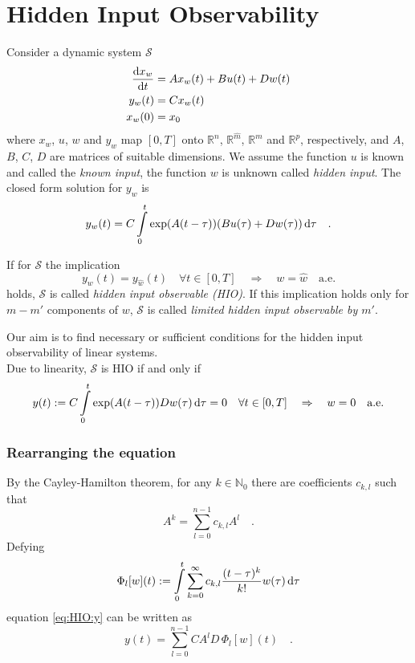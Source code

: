 \section{Hidden Input Observability}
Consider a dynamic system $\mathcal{S}$
\begin{align}
\frac{\text{d} x_w}{\text{d} t} &= Ax_w(t) + Bu(t) + Dw(t) \\
y_w(t) &= Cx_w(t) \\
x_w(0) &= x_0
\end{align}
where $x_w$, $u$, $w$ and $y_w$ map $[0,T]$ onto $\mathbb{R}^n$, 
$\mathbb{R}^{\hat{m}}$, $\mathbb{R}^m$ and $\mathbb{R}^p$, respectively, and 
$A$, $B$, $C$, $D$ are matrices of suitable dimensions. We assume the function $u$ is known 
and called the \textit{known input}, the function $w$ is unknown called 
 \textit{hidden input}. The closed form solution for $y_w$ is
\begin{equation}
y_w(t) = C \int\limits_0^t \exp(A(t-\tau)) (Bu(\tau) + Dw(\tau) ) \, \text{d} 
\tau \quad .
\end{equation}

\begin{definition}
If for $\mathcal{S}$ the implication
\begin{equation}
y_{w}(t) = y_{\hat{w}}(t) \quad \forall t\in [0,T]
\quad \Rightarrow \quad 
 w = \hat{w} \quad \text{a.e.}
\end{equation}
holds, $\mathcal{S}$ is called \textit{hidden input observable (HIO)}. If this 
implication holds only for 
$m-m'$ components of $w$, $\mathcal{S}$ is 
called \textit{limited hidden input observable by $m'$}.
\end{definition}

Our aim is to find necessary or sufficient conditions for the hidden input observability 
of linear systems.\\

Due to linearity, $\mathcal{S}$ is HIO if and only if
\begin{equation}
y(t):=C\int\limits_0^t \exp(A(t-\tau))Dw(\tau)\,\text{d}\tau = 0 \quad 
\forall t\in[0,T] \quad \Rightarrow \quad 
w = 0 \quad \text{a.e.} \label{eq:HIO:y}
\end{equation}

\subsubsection*{Rearranging the equation}
By the Cayley-Hamilton theorem, for any $k\in\mathbb{N}_0$ there are coefficients $c_{k,l}$ 
such that 
\begin{equation}
A^k = \sum\limits_{l=0}^{n-1} c_{k,l} A^l \quad .
\end{equation}
Defying
\begin{equation}
\Phi_l[w](t) :=  \int\limits_0^t \sum\limits_{k=0}^\infty c_{k,l}\frac{(t-\tau)^k}{k!}  
w(\tau) \, \text{d}\tau \label{eq:HIO:Phi}
\end{equation}
equation \eqref{eq:HIO:y} can be written as
\begin{equation}
y(t) = \sum\limits_{l=0}^{n-1} CA^lD \, \Phi_l[w](t)
\quad . \label{eq:HIO:y_operator}
\end{equation}


